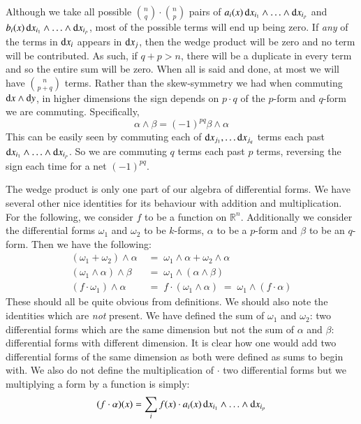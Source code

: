 Although we take all possible $\binom{n}{q} \cdot \binom{n}{p}$ pairs of 
$a_i (x) \mathop{}\!\mathrm{d} x_{i_1} \wedge \ldots \wedge \mathop{}\!\mathrm{d} x_{i_p}$ and $b_i (x) \mathop{}\!\mathrm{d} x_{i_1} \wedge \ldots \wedge \mathop{}\!\mathrm{d} x_{i_p}$,
most of the possible terms will end up being zero.
If \emph{any} of the terms in $\mathop{}\!\mathrm{d} x_{i}$ appears in $\mathop{}\!\mathrm{d} x_{j}$, then the wedge product will be zero 
and no term will be contributed.
As such, if $q+p > n$, there will be a duplicate in every term and so the entire sum will be zero.
When all is said and done, at most we will have $\binom{n}{p+q}$ terms.
Rather than the skew-symmetry we had when commuting $\mathop{}\!\mathrm{d} x \wedge \mathop{}\!\mathrm{d} y$, 
in higher dimensions the sign depends on $p \cdot q$ of the $p$-form and $q$-form we are commuting.
Specifically, 
\begin{equation}
	\alpha \wedge \beta = (-1)^{pq} \beta \wedge \alpha
\end{equation}
This can be easily seen by commuting each of $\mathop{}\!\mathrm{d} x_{j_1}, \ldots \mathop{}\!\mathrm{d} x_{j_q}$ terms each past 
$\mathop{}\!\mathrm{d} x_{i_1}\wedge \ldots \wedge \mathop{}\!\mathrm{d} x_{i_p}$. 
So we are commuting $q$ terms each past $p$ terms, reversing the sign each time for a net $(-1)^{pq}$.


The wedge product is only one part of our algebra of differential forms.
We have several other nice identities for its behaviour with addition and multiplication.
For the following, we consider $f$ to be a function on $\mathbb{R}^n$.
Additionally we consider the differential forms $\omega_1$ and $\omega_2$ to be $k$-forms, 
$\alpha$ to be a $p$-form and $\beta$ to be an $q$-form.
Then we have the following:
\begin{align}
	(\omega_1 + \omega_2) \wedge \alpha  & \;=\; \omega_1 \wedge \alpha + \omega_2 \wedge \alpha \\
	(\omega_1 \wedge \alpha) \wedge \beta & \;=\; \omega_1 \wedge ( \alpha \wedge \beta ) \\
	(f \cdot \omega_1) \wedge \alpha & \;=\;  f \cdot (\omega_1 \wedge \alpha) \;=\; \omega_1 \wedge (f \cdot \alpha)
\end{align}
These should all be quite obvious from definitions. 
We should also note the identities which are \emph{not} present.
We have defined the sum of $\omega_1$ and $\omega_2$: two differential forms which are the same dimension but not
the sum of $\alpha$ and $\beta$: differential forms with different dimension.
It is clear how one would add two differential forms of the same dimension as both were defined as sums to begin with.
We also do not define the multiplication of $\cdot$ two differential forms but we multiplying a form by a function is simply:
\begin{equation}
	(f \cdot \alpha) (x) = \sum_i f(x)\cdot a_i(x) \mathop{}\!\mathrm{d} x_{i_1} \wedge \ldots \wedge \mathop{}\!\mathrm{d} x_{i_p}
\end{equation}


